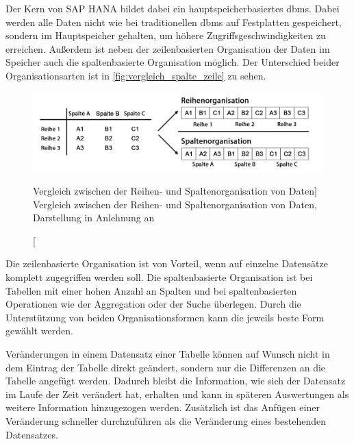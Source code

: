 \begin{onehalfspacing}
Der Kern von SAP HANA bildet dabei ein hauptspeicherbasiertes \gls{dbms}. Dabei werden alle Daten nicht wie bei traditionellen \gls{dbms} auf Festplatten gespeichert, sondern im Hauptspeicher gehalten, um höhere Zugriffsgeschwindigkeiten zu erreichen. Außerdem ist neben der zeilenbasierten Organisation der Daten im Speicher auch die spaltenbasierte Organisation möglich. Der Unterschied beider Organisationsarten ist in \vref{fig:vergleich_spalte_zeile} zu sehen. 

\begin{figure}[ht]
\centering
\setlength{\unitlength}{1mm}
\includegraphics[width=15cm]{images/in-memory-row-column.pdf}
\caption
[Vergleich zwischen der Reihen- und Spaltenorganisation von Daten]
{Vergleich zwischen der Reihen- und Spaltenorganisation von Daten, Darstellung in Anlehnung an  \label{fig:vergleich_spalte_zeile}}
\end{figure}

Die zeilenbasierte Organisation ist von Vorteil, wenn auf einzelne Datensätze komplett zugegriffen werden soll. Die spaltenbasierte Organisation ist bei Tabellen mit einer hohen Anzahl an Spalten und bei spaltenbasierten Operationen wie der Aggregation oder der Suche überlegen. Durch die Unterstützung von beiden Organisationsformen kann die jeweils beste Form gewählt werden.

Veränderungen in einem Datensatz einer Tabelle können auf Wunsch nicht in dem Eintrag der Tabelle direkt geändert, sondern nur die Differenzen an die Tabelle angefügt werden. Dadurch bleibt die Information, wie sich der Datensatz im Laufe der Zeit verändert hat, erhalten und kann in späteren Auswertungen als weitere Information hinzugezogen werden. Zusätzlich ist das Anfügen einer Veränderung schneller durchzuführen als die Veränderung eines bestehenden Datensatzes.


\end{onehalfspacing}
